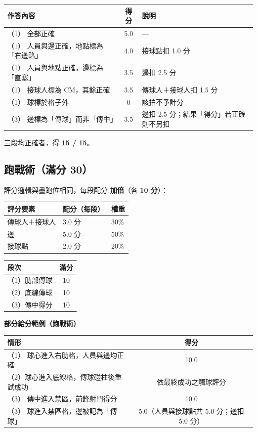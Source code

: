 \documentclass[11pt]{article}
\newcommand{\term}[1]{\textbf{#1}}
\begin{document}
\small
\begin{tabular}{@{}p{4.8cm}cp{4.5cm}@{}}
\toprule
\textbf{作答內容} & \textbf{得分} & \textbf{說明} \\
\midrule
（1） 全部正確 & 5.0 & — \\
（1） 人員與邊正確，地點標為「右邊路」 & 4.0 & 接球點扣 1.0 分 \\
（1） 人員與地點正確，邊標為「直塞」 & 3.5 & 邊扣 2.5 分 \\
（1） 接球人標為 CM，其餘正確 & 3.5 & 傳球人＋接球人扣 1.5 分 \\
（1） 球標於格子外 & 0 & 該拍不予計分 \\
（3） 邊標為「傳球」而非「傳中」 & 3.5 & 邊扣 2.5 分；結果「得分」若正確則不另扣 \\
\bottomrule
\end{tabular}
\normalsize

\vspace{0.4em}
\noindent
三段均正確者，得 \textbf{15 / 15}。

\subsection*{跑戰術（滿分 30）}

評分邏輯與畫跑位相同，每段配分 \term{加倍}（各 \term{10 分}）：

\vspace{0.3em}
\begin{tabular}{@{}lll@{}}
\toprule
\textbf{評分要素} & \textbf{配分（每段）} & \textbf{權重} \\
\midrule
傳球人＋接球人 & 3.0 分 & 30\% \\
邊 & 5.0 分 & 50\% \\
接球點 & 2.0 分 & 20\% \\
\bottomrule
\end{tabular}

\vspace{0.5em}
\begin{tabular}{@{}lc@{}}
\toprule
\textbf{段次} & \textbf{滿分} \\
\midrule
（1）肋部傳球 & 10 \\
（2）底線傳球 & 10 \\
（3）傳中得分 & 10 \\
\bottomrule
\end{tabular}

\vspace{0.6em}
\noindent\textbf{部分給分範例（跑戰術）}

\small
\begin{tabular}{@{}p{7.5cm}c@{}}
\toprule
\textbf{情形} & \textbf{得分} \\
\midrule
（1） 球心進入右肋格，人員與邊均正確 & 10.0 \\
（2）球心進入底線格，傳球碰柱後重試成功 & 依最終成功之觸球評分 \\
（3） 傳中進入禁區，前鋒射門得分 & 10.0 \\
（3） 球進入禁區格，邊被記為「傳球」 & 5.0（人員與接球點共 5.0 分；邊扣 5.0 分） \\
\bottomrule
\end{tabular}
\normalsize
\end{document}
